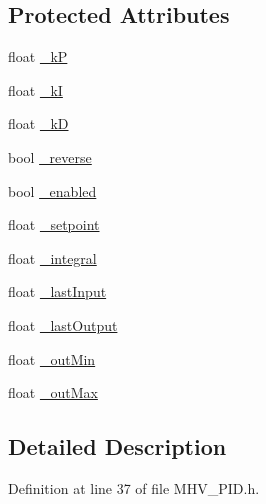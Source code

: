 \subsection*{\-Protected \-Attributes}
\begin{DoxyCompactItemize}
\item 
float \hyperlink{class_m_h_v___p_i_d_a2987b7582914a11ec39c38c2c2f8bb4f}{\-\_\-k\-P}
\item 
float \hyperlink{class_m_h_v___p_i_d_a47e47fe3d120325d9b12e205a274dcaa}{\-\_\-k\-I}
\item 
float \hyperlink{class_m_h_v___p_i_d_a64e69c4f8d1823d16314c88f98a4e18b}{\-\_\-k\-D}
\item 
bool \hyperlink{class_m_h_v___p_i_d_ae47baf90291256480ae57cbbc1ed917c}{\-\_\-reverse}
\item 
bool \hyperlink{class_m_h_v___p_i_d_a17e676a4ac1b18dcf30417b73265e87f}{\-\_\-enabled}
\item 
float \hyperlink{class_m_h_v___p_i_d_a46322bf586cac91fef5c2e38f269c718}{\-\_\-setpoint}
\item 
float \hyperlink{class_m_h_v___p_i_d_a26def3787ab18a8681c361720090b0df}{\-\_\-integral}
\item 
float \hyperlink{class_m_h_v___p_i_d_aa649c3528fb35b99ac6ce0dca338fcfb}{\-\_\-last\-Input}
\item 
float \hyperlink{class_m_h_v___p_i_d_a8464b83c97658e1f78a0c927476af6de}{\-\_\-last\-Output}
\item 
float \hyperlink{class_m_h_v___p_i_d_a1a7aba4cfb7c347428fade3e7a0f6e98}{\-\_\-out\-Min}
\item 
float \hyperlink{class_m_h_v___p_i_d_a0ef2b6cdafc241e3678a4c4f3efbdcec}{\-\_\-out\-Max}
\end{DoxyCompactItemize}


\subsection{\-Detailed \-Description}


\-Definition at line 37 of file \-M\-H\-V\-\_\-\-P\-I\-D.\-h.



